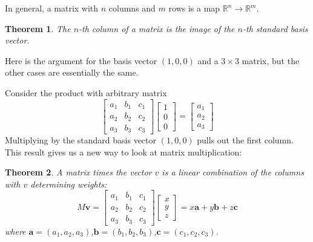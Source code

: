 \documentclass{scrartcl}
\makeatletter
\newtheorem{theorem}{\normalfont\sffamily{}Theorem}
\providecommand{\R}{\mathbb{R}}
\newcommand{\proofname}{\color[gray]{.3}\normalfont\sffamily{}Proof.}
\newcounter{proof}\newcounter{currproofctr}\newcounter{endproofctr}%
\newenvironment{proof}[1][\proofname]{
  \th@nonumberplain
  \normalfont
  \theoremsymbol{\ensuremath{_\blacksquare}}
  \@thm{proof}{proof}{#1}}%
  {\@endtheorem}
\renewcommand{\vec}{\mathbold}
\makeatother
\begin{document}
In general, a matrix with $n$ columns and $m$ rows is a map $\R^n\to\R^m$.

\begin{theorem}\label{matrix-standard-vec}
  The $n$-th column of a matrix is the image of the $n$-th standard basis
  vector.
\end{theorem}
\begin{proof}
  Here is the argument for the basis vector $(1,0,0)$ and a $3\times 3$ matrix, but the other
  cases are essentially the same.

  Consider the product with arbitrary matrix
  \[
    \begin{bmatrix}
      a_1 & b_1 & c_1 \\
      a_2 & b_2 & c_2 \\
      a_3 & b_3 & c_3
    \end{bmatrix}
    \begin{bmatrix}
      1 \\ 0 \\ 0
    \end{bmatrix}
    =
    \begin{bmatrix}
      a_1 \\ a_2 \\ a_3
    \end{bmatrix}
  \]
Multiplying by the standard basis vector $(1,0,0)$ pulls out the first column.
\end{proof}
This result gives us a new way to look at matrix multiplication:
\begin{theorem}\label{matrix-linear-decomp}
  A matrix times the vector $v$ is a linear combination of the columns with $v$
  determining weights:
  \[
    M\vec v=
     \begin{bmatrix}
      a_1 & b_1 & c_1 \\
      a_2 & b_2 & c_2 \\
      a_3 & b_3 & c_3
    \end{bmatrix}
    \begin{bmatrix}
      x \\ y \\ z
    \end{bmatrix}
    =
    x \vec a + y \vec b + z \vec c
\]
where $\vec a=(a_1,a_2,a_3)$,$\vec b=(b_1,b_2,b_3)$,$\vec c=(c_1,c_2,c_3)$.
\end{theorem}
\end{document}
